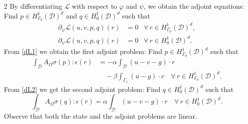 \documentclass[a4paper, oneside]{article}
\begin{document}
\begin{multicols}{2}
By differentiating $\mathcal{L}$ with respect to $\varphi$ and $\psi$,
we obtain the adjoint equations:
Find $p \in  H^1_{\Gamma_0}(\mathcal{D})^d$ and $ q\in H^1_0(\mathcal{D})^d$ such that
\begin{align}
\label{dL1}	\partial_{\varphi}\mathcal{L}(u,v,p,q)(r)&=0 & \forall \, r \in  H^1_{\Gamma_0}(\mathcal{D})^d,\\
\label{dL2}	\partial_{\psi}\mathcal{L}(u,v,p,q)(r)&=0 & \forall \, r \in  H^1_0(\mathcal{D})^d.
\end{align}
From \eqref{dL1} we obtain the first adjoint problem:
Find $p \in  H^1_{\Gamma_0}(\mathcal{D})^d$ such that
\begin{align*} \label{eq:f-adj}
\int_{\mathcal{D}} A_{\Omega}\sigma(p):\epsilon(r) & = -\alpha \int_{\mathcal{D}} (u-v-g) \cdot r \\
&\quad -\beta \int_{\Gamma_1} (u - g) \cdot r \quad
\forall \, r \in  H^1_{\Gamma_0}(\mathcal{D})^d.
\end{align*}
From \eqref{dL2} we get the second adjoint problem:
Find $q \in  H^1_{0}(\mathcal{D})^d$ such that
\begin{equation*} \label{eq:g-adj}
	\int_{\mathcal{D}} A_{\Omega}\sigma(q):\epsilon(r) =
	\alpha \int_{\mathcal{D}} (u-v-g) \cdot r \quad \forall \, r \in  H^1_0(\mathcal{D})^d.
\end{equation*}
Observe that both the state and the adjoint problems are linear.


\end{multicols}
\end{document}
